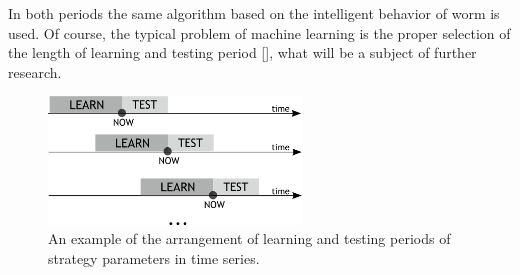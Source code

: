 \documentclass[runningheads,a4paper]{llncs}
\begin{document}
In both periods the same algorithm based on the intelligent behavior of worm is used. Of course, the typical problem of machine learning is the proper selection of the length of learning and testing period [], what will be a subject of further research.\\
\begin{figure}[ht]
\centering
\includegraphics[width = 0.6\textwidth]{figures/rys2.png}
\caption{An example of the arrangement of learning and testing periods of strategy parameters in time series.}
\label{fig:fig2}
\end{figure}
\FloatBarrier
\end{document}
